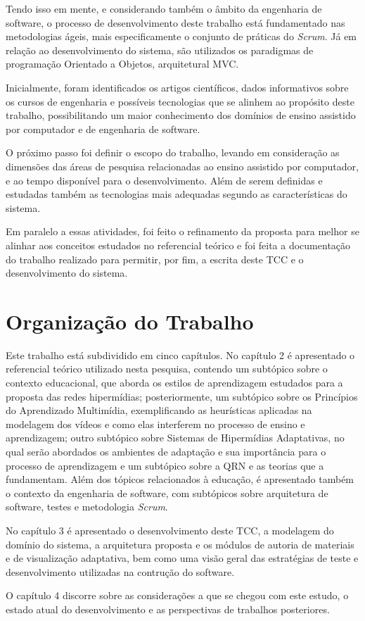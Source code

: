 Tendo isso em mente, e considerando também o âmbito da engenharia de software, o processo de desenvolvimento deste trabalho está fundamentado nas metodologias ágeis, mais especificamente o conjunto de práticas do \textit{Scrum}. Já em relação ao desenvolvimento do sistema, são utilizados os paradigmas de programação Orientado a Objetos, arquitetural MVC.

Inicialmente, foram identificados os artigos científicos, dados informativos sobre os cursos de engenharia e possíveis tecnologias que se alinhem ao propósito deste trabalho, possibilitando um maior conhecimento dos domínios de ensino assistido por computador e de engenharia de software.

O próximo passo foi definir o escopo do trabalho, levando em consideração as dimensões das áreas de pesquisa relacionadas ao ensino assistido por computador, e ao tempo disponível para o desenvolvimento. Além de serem definidas e estudadas também as tecnologias mais adequadas segundo as características do sistema.

Em paralelo a essas atividades, foi feito o refinamento da proposta para melhor se alinhar aos conceitos estudados no referencial teórico e foi feita a documentação do trabalho realizado para permitir, por fim, a escrita deste TCC e o desenvolvimento do sistema.

\section[Organização do Trabalho]{Organização do Trabalho}

Este trabalho está subdividido em cinco capítulos. No capítulo 2 é apresentado o referencial teórico utilizado nesta pesquisa, contendo um subtópico sobre o contexto educacional, que aborda os estilos de aprendizagem estudados para a proposta das redes hipermídias; posteriormente, um subtópico sobre os Princípios do Aprendizado Multimídia, exemplificando as heurísticas aplicadas na modelagem dos vídeos e como elas interferem no processo de ensino e aprendizagem; outro subtópico sobre Sistemas de Hipermídias Adaptativas, no qual serão abordados os ambientes de adaptação e sua importância para o processo de aprendizagem e um subtópico sobre a QRN e as teorias que a fundamentam. Além dos tópicos relacionados à educação, é apresentado também o contexto da engenharia de software, com subtópicos sobre arquitetura de software, testes e metodologia \textit{Scrum}.

No capítulo 3 é apresentado o desenvolvimento deste TCC, a modelagem do domínio do sistema, a arquitetura proposta e os módulos de autoria de materiais e de visualização adaptativa, bem como uma visão geral das estratégias de teste e desenvolvimento utilizadas na contrução do software.

O capítulo 4 discorre sobre as considerações a que se chegou com este estudo, o estado atual do desenvolvimento e as perspectivas de trabalhos posteriores.
